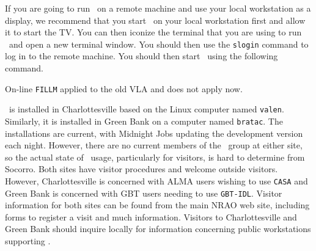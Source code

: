 
    If you are going to run \AIPS\ on a remote machine and use your local
workstation as a display, we recommend that you start \AIPS\ on your local
workstation first and allow it to start the TV. You can then iconize the
terminal that you are using to run \AIPS\ and open a new terminal window.
You should then use the {\tt slogin} command to log in to the remote
machine. You should then start \AIPS\ using the following command.


    On-line {\tt FILLM} applied to the old VLA and does not apply now.


\AIPS\ is installed in Charlottesville based on the Linux computer
named {\tt valen}.  Similarly, it is installed in Green Bank on a
computer named {\tt bratac}.  The installations are current, with
Midnight Jobs updating the development version each night.  However,
there are no current members of the \AIPS\ group at either site, so
the actual state of \AIPS\ usage, particularly for visitors, is hard
to determine from Socorro.  Both sites have visitor procedures and
welcome outside visitors.  However, Charlottesville is concerned with
ALMA users wishing to use {\tt CASA} and Green Bank is concerned with
GBT users needing to use {\tt GBT-IDL}\@.  Visitor information for
both sites can be found from the main NRAO web site, including forms
to register a visit and much information.  Visitors to Charlottesville
and Green Bank should inquire locally for information concerning
public workstations supporting \AIPS\@.
